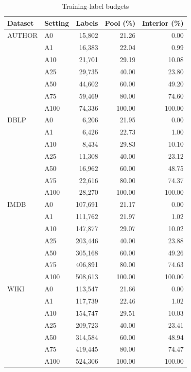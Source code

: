 \begin{table}[H]
\centering\small
\setlength{\tabcolsep}{3pt}
\caption{Training-label budgets}
\label{tab:budget-full}
\begin{tabular}{@{}llrrr@{}}
\toprule
Dataset & Setting & Labels & Pool (\%) & Interior (\%) \\
\midrule
AUTHOR & A0 & 15,802 & 21.26 & 0.00 \\
 & A1 & 16,383 & 22.04 & 0.99 \\
 & A10 & 21,701 & 29.19 & 10.08 \\
 & A25 & 29,735 & 40.00 & 23.80 \\
 & A50 & 44,602 & 60.00 & 49.20 \\
 & A75 & 59,469 & 80.00 & 74.60 \\
 & A100 & 74,336 & 100.00 & 100.00 \\
\midrule
DBLP & A0 & 6,206 & 21.95 & 0.00 \\
 & A1 & 6,426 & 22.73 & 1.00 \\
 & A10 & 8,434 & 29.83 & 10.10 \\
 & A25 & 11,308 & 40.00 & 23.12 \\
 & A50 & 16,962 & 60.00 & 48.75 \\
 & A75 & 22,616 & 80.00 & 74.37 \\
 & A100 & 28,270 & 100.00 & 100.00 \\
\midrule
IMDB & A0 & 107,691 & 21.17 & 0.00 \\
 & A1 & 111,762 & 21.97 & 1.02 \\
 & A10 & 147,877 & 29.07 & 10.02 \\
 & A25 & 203,446 & 40.00 & 23.88 \\
 & A50 & 305,168 & 60.00 & 49.26 \\
 & A75 & 406,891 & 80.00 & 74.63 \\
 & A100 & 508,613 & 100.00 & 100.00 \\
\midrule
WIKI & A0 & 113,547 & 21.66 & 0.00 \\
 & A1 & 117,739 & 22.46 & 1.02 \\
 & A10 & 154,747 & 29.51 & 10.03 \\
 & A25 & 209,723 & 40.00 & 23.41 \\
 & A50 & 314,584 & 60.00 & 48.94 \\
 & A75 & 419,445 & 80.00 & 74.47 \\
 & A100 & 524,306 & 100.00 & 100.00 \\
\bottomrule
\end{tabular}
\end{table}
